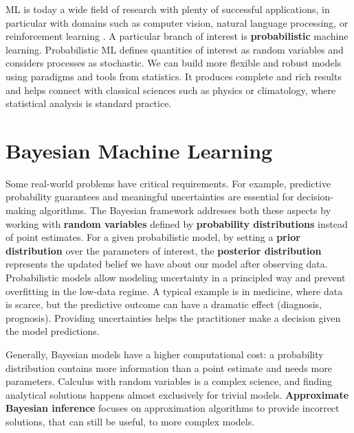 

\ifpdf
    \graphicspath{{chapters/1_introduction/figures/}}
\else
    \graphicspath{{1_introduction/figures/EPS/}{1_introduction/figures/}}
\fi

\ac{ML} is today a wide field of research with plenty of successful applications, in particular with domains such as computer vision, natural language processing, or reinforcement learning \cite{jordan2015machine}.
A particular branch of interest is \textbf{probabilistic} machine learning.
Probabilistic \ac{ML} defines quantities of interest as random variables and considers processes as stochastic.
We can build more flexible and robust models using paradigms and tools from statistics.
It produces complete and rich results and helps connect with classical sciences such as physics or climatology, where statistical analysis is standard practice.

\section{Bayesian Machine Learning}

Some real-world problems have critical requirements.
For example, predictive probability guarantees and meaningful uncertainties are essential for decision-making algorithms.
The Bayesian framework addresses both these aspects by working with \textbf{random variables} defined by \textbf{probability distributions} instead of point estimates.
For a given probabilistic model, by setting a \textbf{prior distribution} over the parameters of interest, the \textbf{posterior distribution} represents the updated belief we have about our model after observing data.
Probabilistic models allow modeling uncertainty in a principled way and prevent overfitting in the low-data regime.\needcite
A typical example is in medicine, where data is scarce, but the predictive outcome can have a dramatic effect (diagnosis, prognosis).
Providing uncertainties helps the practitioner make a decision given the model predictions.

Generally, Bayesian models have a higher computational cost: a probability distribution contains more information than a point estimate and needs more parameters.
Calculus with random variables is a complex science, and finding analytical solutions happens almost exclusively for trivial models.
\textbf{Approximate Bayesian inference} focuses on approximation algorithms to provide incorrect solutions, that can still be useful, to more complex models.

